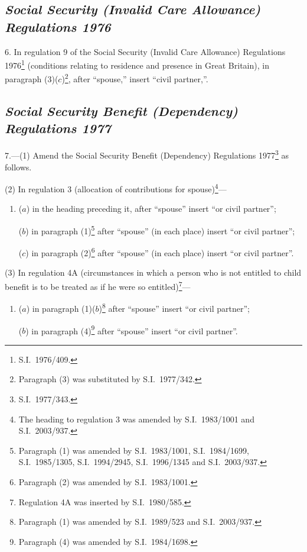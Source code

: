 \documentclass[12pt,a4paper]{article}
\begin{document}
\subsection*{\itshape Social Security (Invalid Care Allowance) Regulations 1976}

6.  In regulation 9 of the Social Security (Invalid Care Allowance) Regulations 1976\footnote{S.I.\ 1976/409.} (conditions relating to residence and presence in Great Britain), in paragraph (3)($c$)\footnote{Paragraph (3) was substituted by S.I.\ 1977/342.}, after “spouse,” insert “civil partner,”.

\subsection*{\itshape Social Security Benefit (Dependency) Regulations 1977}

7.---(1)  Amend the Social Security Benefit (Dependency) Regulations 1977\footnote{S.I.\ 1977/343.} as follows.

(2) In regulation 3 (allocation of contributions for spouse)\footnote{The heading to regulation 3 was amended by S.I.\ 1983/1001 and S.I.\ 2003/937.}—
\begin{enumerate}\item[]
($a$) in the heading preceding it, after “spouse” insert “or civil partner”;

($b$) in paragraph (1)\footnote{Paragraph (1) was amended by S.I.\ 1983/1001, S.I.\ 1984/1699, S.I.\ 1985/1305, S.I.\ 1994/2945, S.I.\ 1996/1345 and S.I.\ 2003/937.} after “spouse” (in each place) insert “or civil partner”;

($c$) in paragraph (2)\footnote{Paragraph (2) was amended by S.I.\ 1983/1001.} after “spouse” (in each place) insert “or civil partner”.
\end{enumerate}

(3) In regulation 4A (circumstances in which a person who is not entitled to child benefit is to be treated as if he were so entitled)\footnote{Regulation 4A was inserted by S.I.\ 1980/585.}—
\begin{enumerate}\item[]
($a$) in paragraph (1)($b$)\footnote{Paragraph (1) was amended by S.I.\ 1989/523 and S.I.\ 2003/937.} after “spouse” insert “or civil partner”;

($b$) in paragraph (4)\footnote{Paragraph (4) was amended by S.I.\ 1984/1698.} after “spouse” insert “or civil partner”.
\end{enumerate}
\end{document}
